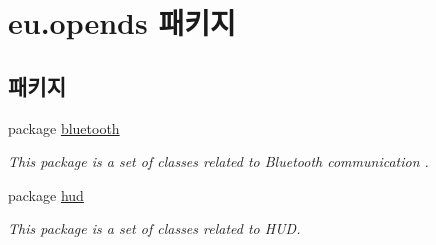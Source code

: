\hypertarget{namespaceeu_1_1opends}{}\section{eu.\+opends 패키지}
\label{namespaceeu_1_1opends}
\subsection*{패키지}
\begin{DoxyCompactItemize}
\item 
package \hyperlink{namespaceeu_1_1opends_1_1bluetooth}{bluetooth}
\begin{DoxyCompactList}\small\item\em This package is a set of classes related to Bluetooth communication . \end{DoxyCompactList}\item 
package \hyperlink{namespaceeu_1_1opends_1_1hud}{hud}
\begin{DoxyCompactList}\small\item\em This package is a set of classes related to H\+U\+D. \end{DoxyCompactList}\end{DoxyCompactItemize}
